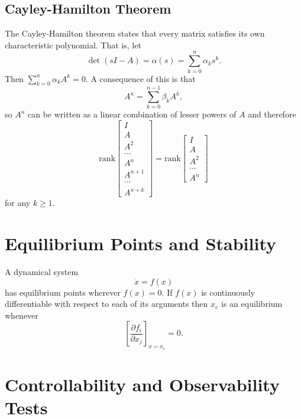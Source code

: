 \documentclass{report}
\begin{document}
\subsection{Cayley-Hamilton Theorem}
The Cayley-Hamilton theorem states that every matrix satisfies its own
characteristic polynomial. That is, let
$$
\det (sI - A) = \alpha(s) = \sum_{k=0}^{n} \alpha_k s^k.
$$
Then $\sum_{k=0}^{n} \alpha_k A^k = 0$. A consequence of this is
that
$$
A^n = \sum_{k=0}^{n-1} \beta_k A^k,
$$
so $A^n$ can be written as a linear combination of lesser powers of
$A$ and therefore
$$
\mathrm{rank}
\left[\begin{array}{c}
  I      \\
  A      \\
  A^2    \\
  \cdots \\
  A^n    \\
  A^{n+1} \\
  \cdots \\
  A^{n+k}
\end{array}\right]
=
\mathrm{rank}
\left[\begin{array}{c}
  I      \\
  A      \\
  A^2    \\
  \cdots \\
  A^n
\end{array}\right]
$$
for any $k \geq 1$.

\section{Equilibrium Points and Stability}
A dynamical system
$$
\dot{x} = f(x)
$$
has equilibrium points wherever $f(x) = 0$. If $f(x)$ is continuously
differentiable with respect to each of its arguments then $x_e$ is an
equilibrium whenever
$$
\left[\frac{\partial f_i}{\partial x_j}\right]_{x = x_e} = 0.
$$

\section{Controllability and Observability Tests}
\end{document}
